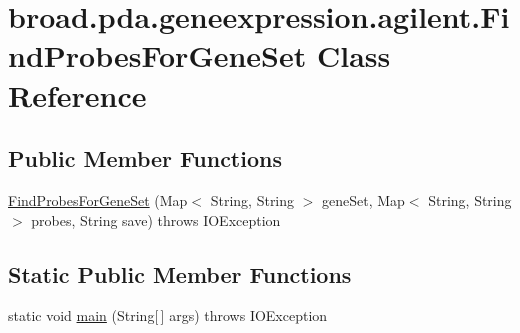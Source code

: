 \hypertarget{classbroad_1_1pda_1_1geneexpression_1_1agilent_1_1_find_probes_for_gene_set}{\section{broad.\+pda.\+geneexpression.\+agilent.\+Find\+Probes\+For\+Gene\+Set Class Reference}
\label{classbroad_1_1pda_1_1geneexpression_1_1agilent_1_1_find_probes_for_gene_set}
}
\subsection*{Public Member Functions}
\begin{DoxyCompactItemize}
\item 
\hyperlink{classbroad_1_1pda_1_1geneexpression_1_1agilent_1_1_find_probes_for_gene_set_afc3885a9ab032e452baa684a86f7525b}{Find\+Probes\+For\+Gene\+Set} (Map$<$ String, String $>$ gene\+Set, Map$<$ String, String $>$ probes, String save)  throws I\+O\+Exception
\end{DoxyCompactItemize}
\subsection*{Static Public Member Functions}
\begin{DoxyCompactItemize}
\item 
static void \hyperlink{classbroad_1_1pda_1_1geneexpression_1_1agilent_1_1_find_probes_for_gene_set_abb20acde160f3a192c745e9a935d9a51}{main} (String\mbox{[}$\,$\mbox{]} args)  throws I\+O\+Exception
\end{DoxyCompactItemize}



